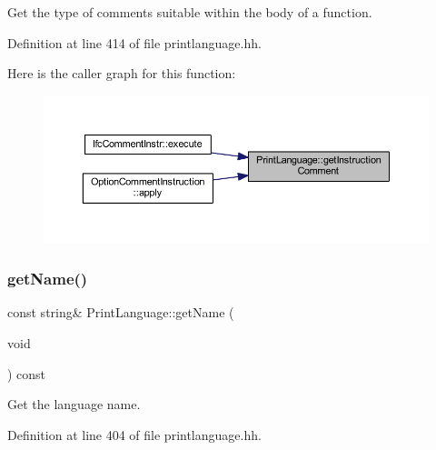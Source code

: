 Get the type of comments suitable within the body of a function. 



Definition at line 414 of file printlanguage.\+hh.

Here is the caller graph for this function\+:
\nopagebreak
\begin{figure}[H]
\begin{center}
\leavevmode
\includegraphics[width=350pt]{class_print_language_a221d681401ac7dbeda9d1abb82b04863_icgraph}
\end{center}
\end{figure}
\mbox{\label{class_print_language_a1818312d92f647fd01a0d38992b1e0c1}} 
\subsubsection{\texorpdfstring{getName()}{getName()}}
{\footnotesize\ttfamily const string\& Print\+Language\+::get\+Name (\begin{DoxyParamCaption}\item[{void}]{ }\end{DoxyParamCaption}) const\hspace{0.3cm}{\ttfamily [inline]}}



Get the language name. 



Definition at line 404 of file printlanguage.\+hh.

